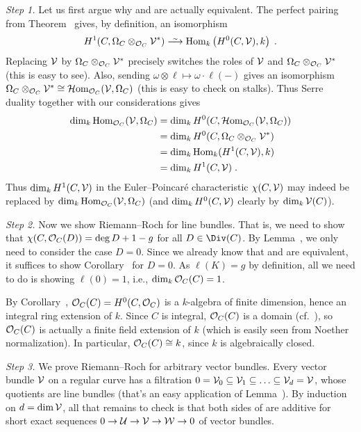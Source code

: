 \documentclass[a4paper,parskip=half,numbers=enddot, DIV=12]{scrreprt}
\begin{document}
\emph{Step 1.} Let us first argue why  and  are actually equivalent. The perfect pairing from Theorem~ gives, by definition, an isomorphism
\begin{align*}
H^1(C,\Omega_C\otimes_{\Oo_C}\Vv^*)\isomorphism\Hom_k\left(H^0(C,\Vv),k\right)\;.
\end{align*}
Replacing $\mathcal{V}$ by $\Omega_C\otimes_{\mathcal{O}_C}\mathcal{V}^*$ precisely switches the roles of $\mathcal{V}$ and $\Omega_C\otimes_{\mathcal{O}_C}\mathcal{V}^*$ (this is easy to see). Also, sending $\omega\otimes\ell\mapsto \omega\cdot \ell(-)$ gives an isomorphism $\Omega_C\otimes_{\mathcal{O}_C}\mathcal{V}^*\cong\operatorname{\mathcal{H} om}_{\mathcal{O}_C}(\mathcal{V},\Omega_C)$ (this is easy to check on stalks). Thus Serre duality together with our considerations gives
\begin{align*}
\dim_k\operatorname{Hom}_{\mathcal{O}_C}(\mathcal{V},\Omega_C)&=\dim_kH^0(C,\operatorname{\mathcal{H} om}_{\mathcal{O}_C}(\mathcal{V},\Omega_C))\\
&=\dim_kH^0(C,\Omega_C\otimes_{\mathcal{O}_C}\mathcal{V}^*)\\
&=\dim_k\operatorname{Hom}_k(H^1(C,\mathcal{V}),k)\\
&=\dim_kH^1(C,\mathcal{V})\;.
\end{align*}
Thus $\dim_kH^1(C,\mathcal{V})$ in the Euler--Poincaré characteristic $\chi(C,\mathcal{V})$ may indeed be replaced by $\dim_k\operatorname{Hom}_{\mathcal{O}_C}(\mathcal{V},\Omega_C)$ (and $\dim_kH^0(C,\mathcal{V})$ clearly by $\dim_k\mathcal{V}(C)$).

\emph{Step 2.} Now we show Riemann--Roch for line bundles. That is, we need to show that $\chi(C,\mathcal{O}_C(D))=\deg D+1-g$ for all $D\in\Div(C)$. By Lemma~, we only need to consider the case $D=0$. Since we already know that  and  are equivalent, it suffices to show Corollary~ for $D=0$. As $\ell(K)=g$ by definition, all we need to do is showing $\ell(0)=1$, i.e., $\dim_k\mathcal{O}_C(C)=1$.

By Corollary~, $\mathcal{O}_C(C)=H^0(C,\mathcal{O}_C)$ is a $k$-algebra of finite dimension, hence an integral ring extension of $k$. Since $C$ is integral, $\mathcal{O}_C(C)$ is a domain (cf.\ \cite[Proposition~2.1.4]{alggeo1}), so $\mathcal{O}_C(C)$ is actually a finite field extension of $k$ (which is easily seen from Noether normalization). In particular, $\mathcal{O}_C(C)\cong k$, since $k$ is algebraically closed.

\emph{Step 3.} We prove Riemann--Roch for arbitrary vector bundles. Every vector bundle $\mathcal{V}$ on a regular curve has a filtration $0=\mathcal{V}_0\subseteq \mathcal{V}_1\subseteq\ldots\subseteq \mathcal{V}_d=\mathcal{V}$, whose quotients are line bundles (that's an easy application of Lemma~).  By induction on $d=\dim\mathcal{V}$, all that remains to check is that both sides of  are additive for short exact sequences $0\morphism\Uu\morphism\Vv\morphism\Ww\morphism 0$ of vector bundles.
\end{document}
